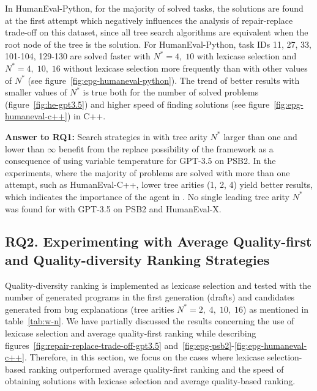 In HumanEval-Python, for the majority of solved tasks, the solutions are found at the first attempt which negatively influences the analysis of repair-replace trade-off on this dataset, since all tree search algorithms are equivalent when the root node of the tree is the solution.
For HumanEval-Python, task IDs 11, 27, 33, 101-104, 129-130 are solved faster with $N^*=4, \; 10$ with lexicase selection and $N^*=4, \; 10, \; 16$ without lexicase selection more frequently than with other values of $N^*$ (see figure~\ref{fig:epg-humaneval-python}).
The trend of better results with smaller values of $N^*$ is true both for the number of solved problems (figure~\ref{fig:he-gpt3.5}) and higher speed of finding solutions (see figure~\ref{fig:epg-humaneval-c++}) in C++.

\begin{highlight}
\textbf{Answer to RQ1:} 
Search strategies in \method{} with tree arity $N^*$ larger than one and lower than $\infty$ benefit from the replace possibility of the \method{} framework as a consequence of using variable temperature for GPT-3.5 on PSB2.
In the experiments, where the majority of problems are solved with more than one attempt, such as HumanEval-C++, lower tree arities (1, 2, 4) yield better results, which indicates the importance of the \debug{} agent in \method{}. 
No single leading tree arity $N^*$ was found for \method{} with GPT-3.5 on PSB2 and HumanEval-X.
\end{highlight}

\newpage \subsection{RQ2. Experimenting with Average Quality-first and Quality-diversity Ranking Strategies}
\label{sec:lexicase-results}

Quality-diversity ranking is implemented as lexicase selection and tested with the number of generated programs in the first generation (drafts) and candidates generated from bug explanations (tree arities $N^*=2,\; 4, \; 10, \; 16$) as mentioned in table~\ref{tab:w-n}.
We have partially discussed the results concerning the use of lexicase selection and average quality-first ranking while describing figures~\ref{fig:repair-replace-trade-off-gpt3.5} and~\ref{fig:epg-psb2}-\ref{fig:epg-humaneval-c++}. 
Therefore, in this section, we focus on the cases where lexicase selection-based ranking outperformed average quality-first ranking and the speed of obtaining solutions with lexicase selection and average quality-based ranking.


